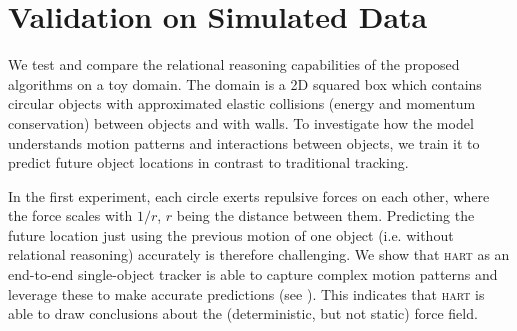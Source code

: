 \section{Validation on Simulated Data} %
\label{sec:experiment_toy}

%


We test and compare the relational reasoning capabilities of the proposed algorithms on a toy domain. The domain is a 2D squared box which contains circular objects with approximated elastic collisions (energy and momentum conservation) between objects and with walls. To investigate how the model understands motion patterns and interactions between objects, we train it to predict future object locations in contrast to traditional tracking.

In the first experiment, each circle exerts repulsive forces on each other, where the force scales with $1/r$, $r$ being the distance between them. Predicting the future location just using the previous motion of one object (i.e. without relational reasoning) accurately is therefore challenging. We show that \textsc{hart} as an end-to-end single-object tracker is able to capture complex motion patterns and leverage these to make accurate predictions (see ). This indicates that \textsc{hart} is able to draw conclusions about the (deterministic, but not static) force field.

